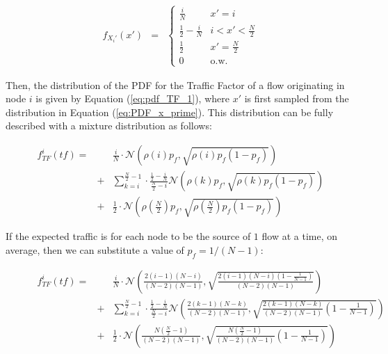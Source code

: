 \begin{eqnarray}
	f_{X_i'}(x') &=&
		\left\{\begin{array}{ll}
		\frac{i}{N} & x' = i  \\
		 \frac{1}{2} - \frac{i}{N} & i < x' < \frac{N}{2} \\
		 \frac{1}{2} & x' = \frac{N}{2} \\ 
		0 &\mbox{o.w.}
		\end{array}\right.
		\label{eq:PDF_x_prime}
\end{eqnarray}

Then, the distribution of the PDF for the Traffic Factor of a flow originating in node $i$ is given by Equation (\ref{eq:pdf_TF_1}), where $x'$ is first sampled from the distribution in Equation (\ref{eq:PDF_x_prime}).  This distribution can be fully described with a mixture distribution as follows:

\begin{eqnarray}
\nonumber
	f_{TF}^i (tf) = &&\frac{i}{N} \cdot \mathcal{N}( \rho(i) p_f, \sqrt{\rho(i) p_f (1-p_f)} )  \\ \nonumber
			   &+& \sum\limits_{k=i}^{\frac{N}{2}-1} \cdot \frac{\frac{1}{2}-\frac{i}{N}}{\frac{N}{2} - i}\mathcal{N}( \rho(k) p_f, \sqrt{\rho(k) p_f (1-p_f)} )  \\
			   &+& \frac{1}{2} \cdot \mathcal{N} ( \rho({\frac{N}{2}}) p_f, \sqrt{\rho(\frac{N}{2}) p_f (1-p_f)} )
\label{eq:full_PDF_TF}
\end{eqnarray}

If the expected traffic is for each node to be the source of $1$ flow at a time, on average, then we can substitute a value of $p_f = 1/(N-1)$:


\begin{figure}
\begin{eqnarray}
\nonumber
	f_{TF}^i (tf) = &&\frac{i}{N} \cdot \mathcal{N}( \frac{2(i-1)(N-i)}{(N-2)(N-1)} , \sqrt{\frac{2(i-1)(N-i)  (1-\frac{1}{N-1})}{(N-2)(N-1)}} )  \\ \nonumber
			   &+& \sum\limits_{k=i}^{\frac{N}{2}-1} \cdot \frac{\frac{1}{2}-\frac{i}{N}}{\frac{N}{2} - i}\mathcal{N}( \frac{2(k-1)(N-k)}{(N-2)(N-1)}, \sqrt{\frac{2(k-1)(N-k)}{(N-2)(N-1)} (1-\frac{1}{N-1})} )  \\
			   &+& \frac{1}{2} \cdot \mathcal{N} ( \frac{N(\frac{N}{2}-1)}{(N-2)(N-1)} , \sqrt{\frac{N(\frac{N}{2}-1)}{(N-2)(N-1)} (1-\frac{1}{N-1})} )
\label{eq:full_PDF_TF_line_2}
\end{eqnarray}
\end{figure}

